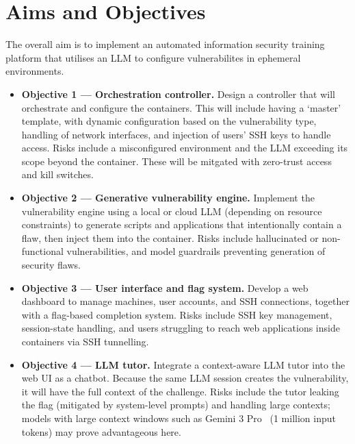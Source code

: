 \documentclass[serif,oneside,single,parskip,raggedright,numeric]{qproposal}
\begin{document}
\newpage

\section{Aims and Objectives}

The overall aim is to implement an automated information security training platform that
utilises an LLM to configure vulnerabilites in ephemeral environments.

\begin{itemize}
  \item \textbf{Objective 1 --- Orchestration controller.}
    Design a controller that will orchestrate and configure the containers. This will include
    having a `master' template, with dynamic configuration based on the vulnerability type,
    handling of network interfaces, and injection of users' SSH keys to handle access. Risks
    include a misconfigured environment and the LLM exceeding its scope beyond the container.
    These will be mitgated with zero-trust access~\citep{ztna-microsoft} and kill switches.

  \item \textbf{Objective 2 --- Generative vulnerability engine.}
    Implement the vulnerability engine using a local or cloud LLM (depending on resource
    constraints) to generate scripts and applications that intentionally contain a flaw,
    then inject them into the container. Risks include hallucinated or non-functional
    vulnerabilities, and model guardrails preventing generation of security flaws.

  \item \textbf{Objective 3 --- User interface and flag system.}
    Develop a web dashboard to manage machines, user accounts, and SSH connections, together
    with a flag-based completion system. Risks include SSH key management, session-state
    handling, and users struggling to reach web applications inside containers via SSH
    tunnelling.

  \item \textbf{Objective 4 --- LLM tutor.}
    Integrate a context-aware LLM tutor into the web UI as a chatbot. Because the same LLM
    session creates the vulnerability, it will have the full context of the challenge. Risks
    include the tutor leaking the flag (mitigated by system-level prompts) and handling
    large contexts; models with large context windows such as Gemini 3
    Pro~\citep{gemini-3-pro} (1 million input tokens) may prove advantageous here.
\end{itemize}
\end{document}
